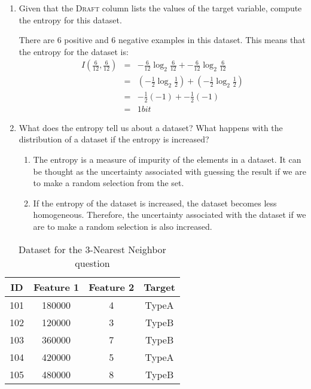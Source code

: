 \documentclass[--SOLUTION-OPTION--]{ditpaper}
\begin{document}
\begin{enumerate}
\begin{enumerate}
		\item Given that the \textsc{Draft} column lists the values of the target variable, compute the entropy for this dataset.
		\begin{answer}
				There are 6 positive and 6 negative examples in this dataset. This means that the entropy for the dataset is:
				\begin{eqnarray*}
					I(\frac{6}{12}, \frac{6}{12}) &=& -\frac{6}{12}\log_2\frac{6}{12} + -\frac{6}{12}\log_2 \frac{6}{12}\\
								~ &=& (-\frac{1}{2}\log_2\frac{1}{2}) + (-\frac{1}{2}\log_2\frac{1}{2}) \\
					~ &=&  -\frac{1}{2}(-1) + -\frac{1}{2}(-1) \\
					 ~ &=&  1bit
				\end{eqnarray*}
		\end{answer}

		\item What does the entropy tell us about a dataset? What happens with the distribution of a dataset if the entropy is increased?
		\begin{answer}
			\begin{enumerate}
				\item The entropy is a measure of impurity of the elements in a dataset. It can be thought as the uncertainty associated with guessing the result if we are to make a random selection from the set.
				\item If the entropy of the dataset is increased, the dataset becomes less homogeneous. Therefore, the uncertainty associated with the dataset if we are to make a random selection is also increased.
			\end{enumerate}
		\end{answer}
	\end{enumerate}

\end{enumerate}

\newpage

\begin{table}[htp]
	\caption{Dataset for the 3-Nearest Neighbor question}
	\begin{center}
		\begin{tabular}{cccc}
			\hline
			ID & Feature 1 & Feature 2  & Target \\
			\hline
			101 & 180000 &	4  & TypeA\\
			102 & 120000 &	3  & TypeB\\
			103 & 360000 &	7  & TypeB\\
			104 & 420000 &	5  & TypeA\\
			105 & 480000 &	8  & TypeB\\
			\hline
		\end{tabular}
	\end{center}
	\label{tab:3nn-data}
\end{table}%
\end{document}
